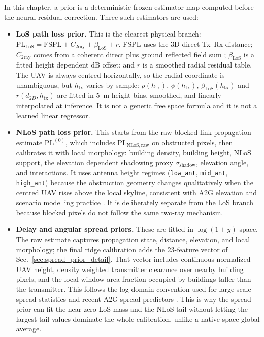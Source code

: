 In this chapter, a prior is a deterministic frozen estimator map computed before
the neural residual correction. Three such estimators are used:
\begin{itemize}
\setlength{\itemsep}{0.16em}
\setlength{\parsep}{0pt}
\setlength{\topsep}{0.15em}
\item \textbf{LoS path loss prior.} This is the clearest physical branch:
      \(\mathrm{PL}_{\mathrm{LoS}}=\mathrm{FSPL}+C_{\mathrm{2ray}}+\beta_{\mathrm{LoS}}+r\).
      FSPL uses the 3D direct Tx--Rx distance; \(C_{\mathrm{2ray}}\) comes
      from a coherent direct plus ground reflected field sum
      \cite{rappaport,wocc2021}; \(\beta_{\mathrm{LoS}}\) is a fitted height
      dependent dB offset; and \(r\) is a smoothed radial
      residual table. The UAV is always centred horizontally, so the radial
      coordinate is unambiguous, but \(h_{\mathrm{tx}}\) varies by sample:
      \(\rho(h_{\mathrm{tx}})\), \(\phi(h_{\mathrm{tx}})\),
      \(\beta_{\mathrm{LoS}}(h_{\mathrm{tx}})\)
      and \(r(d_{2D},h_{\mathrm{tx}})\) are fitted in \SI{5}{m} height bins,
      smoothed, and linearly interpolated at inference. It is not a generic
      free space formula and it is not a learned linear regressor.
\item \textbf{NLoS path loss prior.} This starts from the raw blocked link
      propagation estimate \(\mathrm{PL}^{(0)}\), which includes
      \(\mathrm{PL}_{\mathrm{NLoS,raw}}\) on obstructed pixels, then calibrates
      it with local morphology: building density, building height, NLoS support,
      the elevation dependent shadowing proxy \(\sigma_{\mathrm{shadow}}\),
      elevation angle, and interactions. It uses antenna height regimes
      (\texttt{low\_ant}, \texttt{mid\_ant}, \texttt{high\_ant}) because the
      obstruction geometry changes qualitatively when the centred UAV rises
      above the local skyline, consistent with A2G elevation and scenario
      modelling practice \cite{cost231,tr38901,alhourani2014,khawaja_survey}.
      It is deliberately separate from the LoS branch
      because blocked pixels do not follow the same two-ray mechanism.
\item \textbf{Delay and angular spread priors.} These are fitted in
      \(\log(1+y)\) space. The raw estimate captures propagation state,
      distance, elevation, and local morphology; the final ridge calibration
      adds the 23-feature vector of Sec.~\ref{sec:spread_prior_detail}. That vector
      includes continuous normalized UAV height, density weighted transmitter
      clearance over nearby building pixels, and the local window area fraction
      occupied by buildings taller than the transmitter. This follows the
      log domain convention used for large scale spread statistics and recent
      A2G spread predictors \cite{tr38901,winner2,yang2019a2gml,huang2025a2gtransformer}.
      This is why the spread prior can fit the near zero LoS mass
      and the NLoS tail without letting the largest tail values dominate the
      whole calibration, unlike a native space global average.
\end{itemize}

